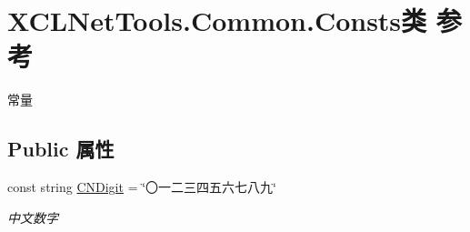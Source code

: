\hypertarget{class_x_c_l_net_tools_1_1_common_1_1_consts}{\section{X\-C\-L\-Net\-Tools.\-Common.\-Consts类 参考}
\label{class_x_c_l_net_tools_1_1_common_1_1_consts}
}


常量  


\subsection*{Public 属性}
\begin{DoxyCompactItemize}
\item 
const string \hyperlink{class_x_c_l_net_tools_1_1_common_1_1_consts_afe7a5665a03a08e31c9cca0f7bc2b974}{C\-N\-Digit} = \char`\"{}〇一二三四五六七八九\char`\"{}
\begin{DoxyCompactList}\small\item\em 中文数字 \end{DoxyCompactList}\end{DoxyCompactItemize}
